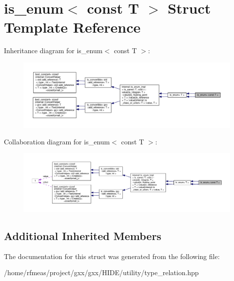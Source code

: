 \hypertarget{structis__enum_3_01const_01T_01_4}{}\section{is\+\_\+enum$<$ const T $>$ Struct Template Reference}
\label{structis__enum_3_01const_01T_01_4}


Inheritance diagram for is\+\_\+enum$<$ const T $>$\+:
\nopagebreak
\begin{figure}[H]
\begin{center}
\leavevmode
\includegraphics[width=350pt]{structis__enum_3_01const_01T_01_4__inherit__graph}
\end{center}
\end{figure}


Collaboration diagram for is\+\_\+enum$<$ const T $>$\+:
\nopagebreak
\begin{figure}[H]
\begin{center}
\leavevmode
\includegraphics[width=350pt]{structis__enum_3_01const_01T_01_4__coll__graph}
\end{center}
\end{figure}
\subsection*{Additional Inherited Members}


The documentation for this struct was generated from the following file\+:\begin{DoxyCompactItemize}
\item 
/home/rfmeas/project/gxx/gxx/\+H\+I\+D\+E/utility/type\+\_\+relation.\+hpp\end{DoxyCompactItemize}
